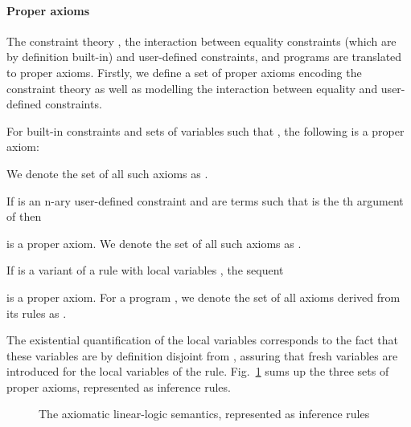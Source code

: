 \documentclass[acmtocl]{acmtrans2m}
\begin{document}
\paragraph*{Proper axioms} The constraint theory , the interaction between
equality constraints (which are by definition built-in) and user-defined
constraints, and programs are translated to proper axioms. Firstly, we define a
set of proper axioms encoding the constraint theory as well as modelling the
interaction between equality  and user-defined constraints.

\begin{definition}[()] For built-in constraints 
and sets of variables  such that , the following is a proper axiom:

We denote the set of all such axioms as .
\end{definition}

\begin{definition}[()]
If  is an n-ary user-defined constraint and  are terms such that
 is the th argument of  then

is a proper axiom. We denote the set of all such axioms as .
\end{definition}

\begin{definition}[()] If  is a variant of a rule with local variables , the sequent

is a proper axiom. For a program , we denote the set of all axioms derived
from its rules as .
\end{definition}

The existential quantification of the local variables  corresponds to the
fact that these variables are by definition disjoint from
, assuring that fresh variables are introduced for the
local variables of the rule. Fig.~\ref{fig:chr-axiomatic-semantics} sums up the
three sets of proper axioms, represented as inference rules.

\begin{figure}
\label{fig:chr-axiomatic-semantics}
\begin{center}
\end{center}
\caption{The axiomatic linear-logic semantics, represented as inference rules}
\end{figure}
\end{document}
